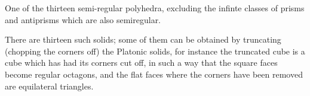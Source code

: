 One of the thirteen semi-regular polyhedra, excluding the infinte
classes of prisms and antiprisms which are also semiregular.
\par
There are thirteen such solids; some of them can be
obtained by truncating (chopping the corners off) the Platonic solids,
for instance the truncated cube is a cube which has had its corners cut
off, in such a way that the square faces become regular octagons, and
the flat faces where the corners have been removed are equilateral
triangles.